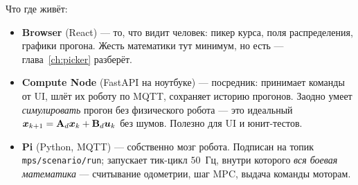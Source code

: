 \begin{center}
\end{center}

Что где живёт:

\begin{itemize}
  \item \textbf{Browser} (React) --- то, что видит человек: пикер курса,
        поля распределения, графики прогона. Жесть математики тут
        минимум, но есть --- глава~\ref{ch:picker} разберёт.
  \item \textbf{Compute Node} (FastAPI на ноутбуке) --- посредник: принимает
        команды от UI, шлёт их роботу по MQTT, сохраняет историю прогонов.
        Заодно умеет \emph{симулировать} прогон без физического робота
        --- это идеальный $\bm{x}_{k+1} = \mathbf{A}_d\bm{x}_k + \mathbf{B}_d\bm{u}_k$
        без шумов. Полезно для UI и юнит-тестов.
  \item \textbf{Pi} (Python, MQTT) --- собственно мозг робота. Подписан
        на топик \texttt{mps/scenario/run}; запускает тик-цикл $50$~Гц,
        внутри которого \emph{вся боевая математика} --- считывание
        одометрии, шаг MPC, выдача команды моторам.
\end{itemize}


